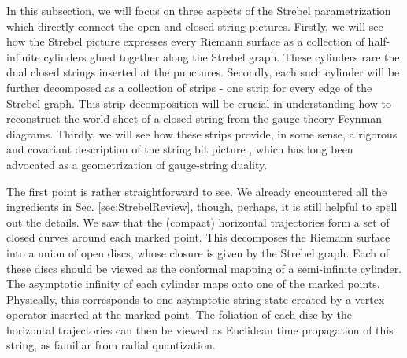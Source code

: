 \documentclass[english]{article}
\renewcommand{\>}{\rangle}
\newcommand{\<}{\langle}
\renewcommand{\(}{\left(}
\renewcommand{\)}{\right)}
\begin{document}
In this subsection, we will focus on three aspects of the Strebel parametrization which directly connect the open and closed string pictures. Firstly, we will see how the Strebel picture expresses every Riemann surface as a collection of half-infinite cylinders glued together along the Strebel graph. These cylinders rare the dual closed strings inserted at the punctures. Secondly, each such cylinder will be further decomposed as a collection of strips - one strip for every edge of the Strebel graph. This strip decomposition will be crucial in understanding how to reconstruct the world sheet of a closed string from the gauge theory Feynman diagrams. Thirdly, we will see how these strips provide, in some sense, a rigorous and covariant description of the string bit picture \cite{KogutBits,Thorn:1991fv, Klebanov-susskind}, which has long been advocated as a geometrization of gauge-string duality.

The first point is rather straightforward to see. We already encountered all the ingredients in Sec. \ref{sec:StrebelReview}, though, perhaps, it is still helpful to spell out the details. We saw that the (compact) horizontal trajectories form a set of closed curves around each marked point. This decomposes the Riemann surface into a union of open discs, whose closure is given by the Strebel graph. Each of these discs should be viewed as the conformal mapping of a semi-infinite cylinder. The asymptotic infinity of each cylinder maps onto one of the marked points. Physically, this corresponds to one asymptotic string state created by a vertex operator inserted at the marked point. The foliation of each disc by the horizontal trajectories can then be viewed as Euclidean time propagation of this string, as familiar from radial quantization. 
\end{document}
